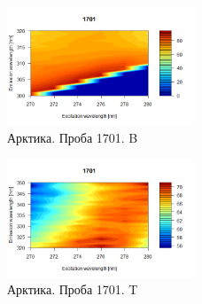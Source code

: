 \newpage
 \begin{figure}[!htb]
    \centering
    \includegraphics[width=0.5\textwidth]{fig/Arctic_3_B.png}
    \caption{Арктика. Проба 1701. B}
\end{figure}
 \begin{figure}[!htb]
    \centering
    \includegraphics[width=0.5\textwidth]{fig/Arctic_3_T.png}
    \caption{Арктика. Проба 1701. T}
\end{figure}

